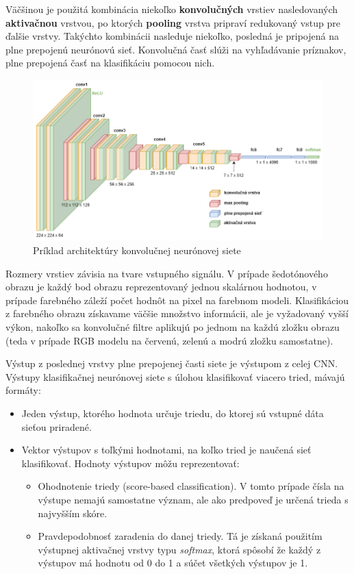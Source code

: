         Väčšinou je použitá kombinácia niekoľko \textbf{konvolučných} vrstiev nasledovaných \textbf{aktivačnou} vrstvou, po ktorých \textbf{pooling} vrstva pripraví redukovaný vstup pre ďalšie vrstvy. Takýchto kombinácii nasleduje niekoľko, posledná je pripojená na plne prepojenú neurónovú sieť. Konvolučná časť slúži na vyhľadávanie príznakov, plne prepojená časť na klasifikáciu pomocou nich.

        \begin{figure}[h]
            \centering
            \includegraphics[width=.9\textwidth]{obrazky/cnn/cnn.png}
            \caption{Príklad architektúry konvolučnej neurónovej siete}
        \end{figure}

        Rozmery vrstiev závisia na tvare vstupného signálu. V prípade šedotónového obrazu je každý bod obrazu reprezentovaný jednou skalárnou hodnotou, v prípade farebného záleží počet hodnôt na pixel na farebnom modeli. Klasifikáciou z farebného obrazu získavame väčšie množstvo informácii, ale je vyžadovaný vyšší výkon, nakoľko sa konvolučné filtre aplikujú po jednom na každú zložku obrazu (teda v prípade RGB modelu na červenú, zelenú a modrú zložku samostatne).

        Výstup z poslednej vrstvy plne prepojenej časti siete je výstupom z celej \ac{CNN}. Výstupy klasifikačnej neurónovej siete s úlohou klasifikovať viacero tried, mávajú formáty:

        \begin{itemize}
            \item Jeden výstup, ktorého hodnota určuje triedu, do ktorej sú vstupné dáta sieťou priradené.
            \item Vektor výstupov s toľkými hodnotami, na koľko tried je naučená sieť klasifikovať. Hodnoty výstupov môžu reprezentovať:
            \begin{itemize}
                \item Ohodnotenie triedy (score-based classification). V tomto prípade čísla na výstupe nemajú samostatne význam, ale ako predpoveď je určená trieda s najvyšším skóre.
                \item Pravdepodobnosť zaradenia do danej triedy. Tá je získaná použitím výstupnej aktivačnej vrstvy typu \emph{softmax}, ktorá spôsobí že každý z výstupov má hodnotu od 0 do 1 a súčet všetkých výstupov je 1.
            \end{itemize}
        \end{itemize}
        

